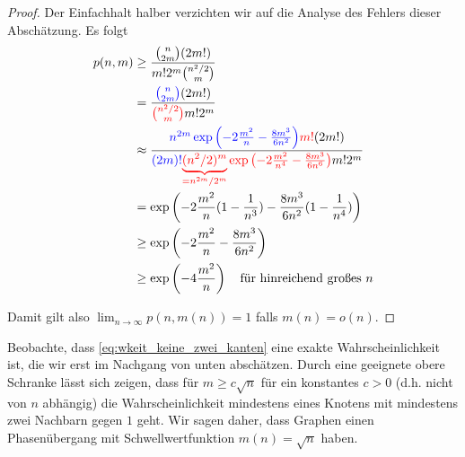 \begin{proof}
    Der Einfachhalt halber verzichten wir auf die Analyse des Fehlers dieser Abschätzung.
    Es folgt
    \begin{align}
        p(n, m)
         & \ge \frac{\binom{n}{2m} (2m!)}{m! 2^m \binom{n^2/2}{m}}                                                                                   \\
         & = \frac{\textcolor{blue}{\binom{n}{2m}}(2m!)}{\textcolor{red}{\binom{n^2/2}{m}} m! 2^m}                                                   \\
         & \approx \frac{
        \textcolor{blue}{n^{2m} \exp\left(-2\frac{m^2}{n} - \frac{8m^3}{6n^2}\right)}\textcolor{red}{m!}(2m!)
        }{
        \textcolor{blue}{(2m)!}\textcolor{red}{\underbrace{(n^2/2)^m}_{=n^{2m} / 2^m} \exp\left(-2\frac{m^2}{n^4} - \frac{8m^3}{6n^6}\right)} m!2^m} \\
         & = \exp\left(-2\frac{m^2}{n} (1 - \frac{1}{n^3}) - \frac{8m^3}{6n^2} (1 - \frac{1}{n^4}) \right)                                           \\
         & \ge \exp\left(-2\frac{m^2}{n} - \frac{8m^3}{6n^2} \right)                                                                                 \\
         & \ge \exp\left(-4\frac{m^2}{n} \right) \quad \text{für hinreichend großes $n$}
    \end{align}

    Damit gilt also $\lim_{n \to \infty} p(n, m(n)) = 1$ falls $m(n) = o(n)$.
\end{proof}

Beobachte, dass \cref{eq:wkeit_keine_zwei_kanten} eine exakte Wahrscheinlichkeit ist, die wir erst im Nachgang von unten abschätzen.
Durch eine geeignete obere Schranke lässt sich zeigen, dass für $m \ge c \sqrt n$ für ein konstantes $c > 0$ (d.h. nicht von $n$ abhängig) die Wahrscheinlichkeit mindestens eines Knotens mit mindestens zwei Nachbarn gegen $1$ geht.
Wir sagen daher, dass \Gnm Graphen einen Phasenübergang mit Schwellwertfunktion $m(n) = \sqrt n$ haben.


\bigskip


